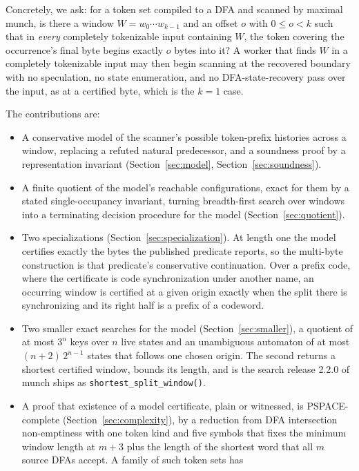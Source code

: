 \documentclass[11pt,a4paper]{article}
\theoremstyle{definition}
\theoremstyle{plain}
\newcommand{\code}[1]{\texttt{#1}}
\begin{document}
Concretely, we ask: for a token set compiled to a DFA and scanned by maximal munch, is there a window
$W = w_0 \cdots w_{k-1}$ and an offset $o$ with $0 \leq o < k$ such that in \emph{every} completely tokenizable input
containing $W$, the token covering the occurrence's final byte begins exactly $o$ bytes into it? A worker that finds $W$
in a completely tokenizable input may then begin scanning at the recovered boundary with no speculation, no state
enumeration, and no DFA-state-recovery pass over the input, as at a certified byte, which is the $k = 1$ case.

The contributions are:

\begin{itemize}
\item
A conservative model of the scanner's possible token-prefix histories across a window, replacing a refuted natural
predecessor, and a soundness proof by a representation invariant (Section~\ref{sec:model}, Section~\ref{sec:soundness}).
\item
A finite quotient of the model's reachable configurations, exact for them by a stated single-occupancy invariant,
turning breadth-first search over windows into a terminating decision procedure for the model
(Section~\ref{sec:quotient}).
\item
Two specializations (Section~\ref{sec:specialization}). At length one the model certifies exactly the bytes the
published predicate reports, so the multi-byte construction is that predicate's conservative continuation. Over a prefix
code, where the certificate is code synchronization under another name, an occurring window is certified at a given
origin exactly when the split there is synchronizing and its right half is a prefix of a codeword.
\item
Two smaller exact searches for the model (Section~\ref{sec:smaller}), a quotient of at most $3^n$ keys over $n$ live
states and an unambiguous automaton of at most $(n + 2)\, 2^{n-1}$ states that follows one chosen origin. The second
returns a shortest certified window, bounds its length, and is the search release 2.2.0 of munch ships as
\code{shortest\_split\_window()}.
\item
A proof that existence of a model certificate, plain or witnessed, is PSPACE-complete (Section~\ref{sec:complexity}), by
a reduction from DFA intersection non-emptiness with one token kind and five symbols that fixes the minimum window
length at $m + 3$ plus the length of the shortest word that all $m$ source DFAs accept. A family of such token sets has

\end{itemize}
\end{document}
